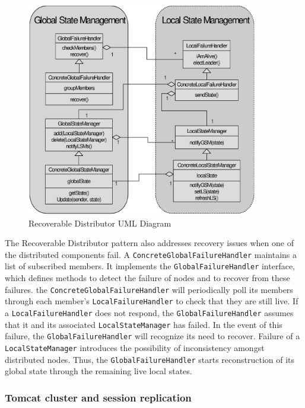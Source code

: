 \begin{figure}
\begin{center}
  \includegraphics[width=0.9\textwidth]{./images/recoverableDistributor}
  \caption{Recoverable Distributor UML Diagram}
  \label{fig:rd}
\end{center}
\end{figure}

The Recoverable Distributor pattern also addresses recovery issues when one of
the distributed components fail. A \texttt{ConcreteGlobalFailureHandler}
maintains a list of subscribed members. It implements the
\texttt{GlobalFailureHandler} interface, which defines methods to detect the
failure of nodes and to recover from these failures. the
\texttt{ConcreteGlobalFailureHandler} will periodically poll its members through
each member's \texttt{LocalFailureHandler} to check that they are still live. If
a \texttt{LocalFailureHandler} does not respond, the
\texttt{GlobalFailureHandler} assumes that it and its associated
\texttt{LocalStateManager} has failed. In the event of this failure, the
\texttt{GlobalFailureHandler} will recognize its need to recover. Failure of a
\texttt{LocalStateManager} introduces the possibility of inconsistency amongst
distributed nodes. Thus, the \texttt{GlobalFailureHandler} starts reconstruction
of its global state through the remaining live local states.

\subsubsection{Tomcat cluster and session replication}

